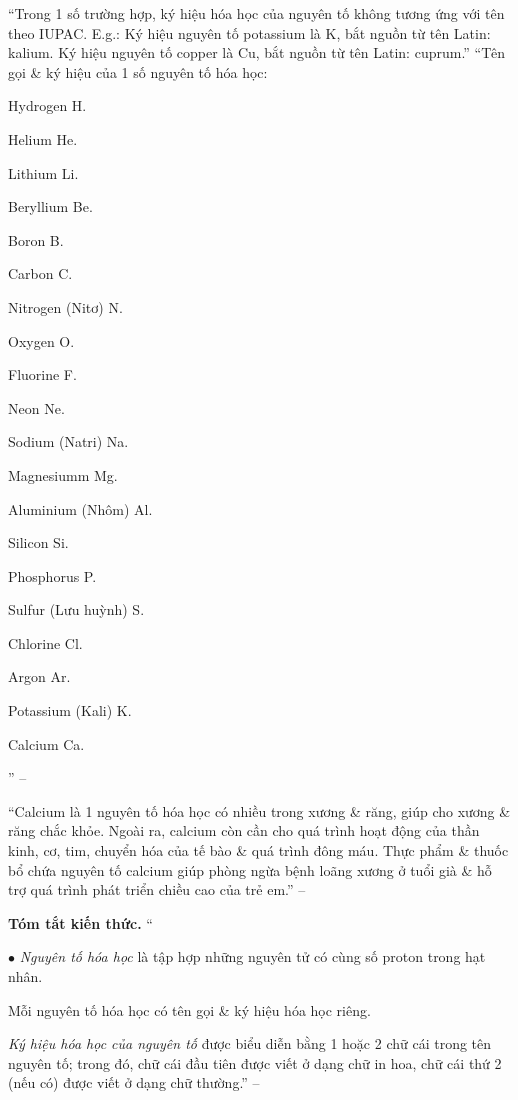 \documentclass{article}
\numberwithin{equation}{section}
\begin{document}
``Trong 1 số trường hợp, ký hiệu hóa học của nguyên tố không tương ứng với tên theo IUPAC. E.g.: Ký hiệu nguyên tố potassium là K, bắt nguồn từ tên Latin: kalium. Ký hiệu nguyên tố copper là Cu, bắt nguồn từ tên Latin: cuprum.'' ``Tên gọi \& ký hiệu của 1 số nguyên tố hóa học:
\begin{enumerate*}
	\item Hydrogen H.
	\item Helium He.
	\item Lithium Li.
	\item Beryllium Be.
	\item Boron B.
	\item Carbon C.
	\item Nitrogen (Nitơ) N.
	\item Oxygen O.
	\item Fluorine F.
	\item Neon Ne.
	\item Sodium (Natri) Na.
	\item Magnesiumm Mg.
	\item Aluminium (Nhôm) Al.
	\item Silicon Si.
	\item Phosphorus P.
	\item Sulfur (Lưu huỳnh) S.
	\item Chlorine Cl.
	\item Argon Ar.
	\item Potassium (Kali) K.
	\item Calcium Ca.
\end{enumerate*}
'' -- \cite[p. 17]{SGK_KHTN_7_Canh_Dieu}

``Calcium là 1 nguyên tố hóa học có nhiều trong xương \& răng, giúp cho xương \& răng chắc khỏe. Ngoài ra, calcium còn cần cho quá trình hoạt động của thần kinh, cơ, tim, chuyển hóa của tế bào \& quá trình đông máu. Thực phẩm \& thuốc bổ chứa nguyên tố calcium giúp phòng ngừa bệnh loãng xương ở tuổi già \& hỗ trợ quá trình phát triển chiều cao của trẻ em.'' -- \cite[p. 18]{SGK_KHTN_7_Canh_Dieu}
\vspace{2mm}

\noindent\textbf{Tóm tắt kiến thức.}
``\begin{enumerate*}
	\item[$\bullet$] \textit{Nguyên tố hóa học} là tập hợp những nguyên tử có cùng số proton trong hạt nhân.
	\item Mỗi nguyên tố hóa học có tên gọi \& ký hiệu hóa học riêng.
	\item \textit{Ký hiệu hóa học của nguyên tố} được biểu diễn bằng 1 hoặc 2 chữ cái trong tên nguyên tố; trong đó, chữ cái đầu tiên được viết ở dạng chữ in hoa, chữ cái thứ 2 (nếu có) được viết ở dạng chữ thường.'' -- \cite[p. 18]{SGK_KHTN_7_Canh_Dieu}
\end{enumerate*}
\end{document}

